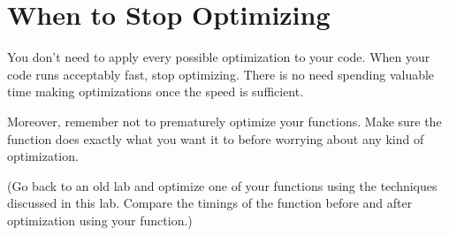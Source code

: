 \section*{When to Stop Optimizing}
You don't need to apply every possible optimization to your code.
When your code runs acceptably fast, stop optimizing. There is no need spending valuable time making optimizations once the speed is sufficient.

Moreover, remember not to prematurely optimize your functions. Make sure the function does exactly what you want it to before worrying about any kind of optimization.

\begin{problem}
    (Go back to an old lab and optimize one of your functions using the techniques discussed in this lab. Compare the timings of the function before and after optimization using your  function.)
\end{problem}
